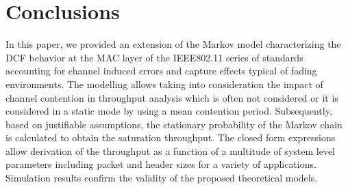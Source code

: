 \documentclass[10pt,onecolumn,a4paper]{IEEEtran}
\begin{document}
\section{Conclusions}
In this paper, we provided an extension of the Markov model
characterizing the DCF behavior at the MAC layer of the IEEE802.11
series of standards accounting for channel induced errors and
capture effects typical of fading environments. The modelling
allows taking into consideration the impact of channel contention
in throughput analysis which is often not considered or it is
considered in a static mode by using a mean contention period.
Subsequently, based on justifiable assumptions, the stationary
probability of the Markov chain is calculated to obtain the
saturation throughput. The closed form expressions allow
derivation of the throughput as a function of a multitude of
system level parameters including packet and header sizes for a
variety of applications. Simulation results confirm the validity
of the proposed theoretical models.
\clearpage
\end{document}
